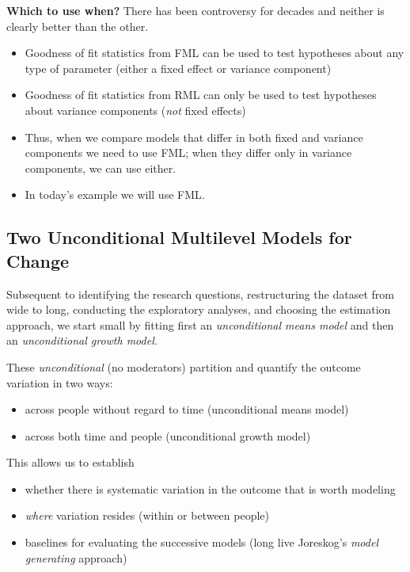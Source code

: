 \documentclass[
  11pt,
]{book}
\providecommand{\tightlist}{%
  \setlength{\itemsep}{0pt}\setlength{\parskip}{0pt}}
\begin{document}
\textbf{Which to use when?}
There has been controversy for decades and neither is clearly better than the other.

\begin{itemize}
\tightlist
\item
  Goodness of fit statistics from FML can be used to test hypotheses about any type of parameter (either a fixed effect or variance component)
\item
  Goodness of fit statistics from RML can only be used to test hypotheses about variance components (\emph{not} fixed effects)
\item
  Thus, when we compare models that differ in both fixed and variance components we need to use FML; when they differ only in variance components, we can use either.
\item
  In today's example we will use FML.
\end{itemize}

\hypertarget{two-unconditional-multilevel-models-for-change}{%
\subsection{Two Unconditional Multilevel Models for Change}\label{two-unconditional-multilevel-models-for-change}}

Subsequent to identifying the research questions, restructuring the dataset from wide to long, conducting the exploratory analyses, and choosing the estimation approach, we start small by fitting first an \emph{unconditional means model} and then an \emph{unconditional growth model.}

These \emph{unconditional} (no moderators) partition and quantify the outcome variation in two ways:

\begin{itemize}
\tightlist
\item
  across people without regard to time (unconditional means model)
\item
  across both time and people (unconditional growth model)
\end{itemize}

This allows us to establish

\begin{itemize}
\tightlist
\item
  whether there is systematic variation in the outcome that is worth modeling
\item
  \emph{where} variation resides (within or between people)
\item
  baselines for evaluating the successive models (long live Joreskog's \emph{model generating} approach)
\end{itemize}
\end{document}
